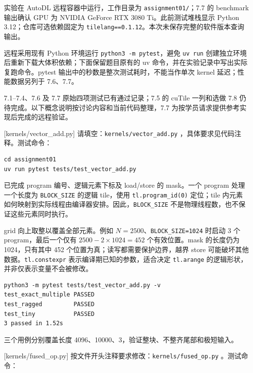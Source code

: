 \documentclass[11pt,a4paper,fontset=none]{ctexart}
\begin{document}
\begin{tcolorbox}[title={模块 7 实验环境与记录口径（2026-09-11）},breakable]
实验在 AutoDL 远程容器中运行，工作目录为 \texttt{assignment01/}；7.7 的 benchmark 输出确认 GPU 为 NVIDIA GeForce RTX 3080 Ti。此前测试堆栈显示 Python 3.12；仓库可选依赖固定为 \texttt{tilelang==0.1.12}。本次未保存完整的软件版本查询输出。

远程采用现有 Python 环境运行 \texttt{python3 -m pytest}，避免 \texttt{uv run} 创建独立环境后重新下载大体积依赖；下面保留题目原有的 uv 命令，并在实验记录中写出实际复跑命令。pytest 输出中的秒数是整次测试耗时，不能当作单次 kernel 延迟；性能数据另列于 7.6、7.7。

7.1--7.4、7.6 及 7.7 原始四项测试已有通过记录；7.5 的 cuTile 一列和选做 7.8 仍待完成。以下概念说明按讨论内容和当前代码整理，7.7 为按学员请求提供参考实现后完成的远程验证。
\end{tcolorbox}

[kernels/vector\_add.py]
请填空：\texttt{kernels/vector\_add.py} ，具体要求见代码注释。测试命令：

\begin{lstlisting}
cd assignment01
uv run pytest tests/test_vector_add.py
\end{lstlisting}

\begin{tcolorbox}[title={7.1 实现与实验记录},breakable]
已完成 program 编号、逻辑元素下标及 load/store 的 mask。一个 program 处理一个长度为 \texttt{BLOCK\_SIZE} 的逻辑 tile，使用 \texttt{tl.program\_id(0)} 定位；tile 内元素如何映射到实际线程由编译器安排。因此，\texttt{BLOCK\_SIZE} 不是物理线程数，也不保证这些元素同时执行。

grid 向上取整以覆盖全部元素。例如 $N=2500$、\texttt{BLOCK\_SIZE=1024} 时启动 3 个 program，最后一个仅有 $2500-2\times1024=452$ 个有效位置。mask 的长度仍为 1024，只有其中 452 个位置为真；读写都需要保护边界，越界 store 可能破坏其他数据。\texttt{tl.constexpr} 表示编译期已知的参数，适合决定 \texttt{tl.arange} 的逻辑形状，并非仅表示变量不会被修改。

\begin{lstlisting}
python3 -m pytest tests/test_vector_add.py -v
test_exact_multiple PASSED
test_ragged         PASSED
test_tiny           PASSED
3 passed in 1.52s
\end{lstlisting}
三个用例分别覆盖长度 4096、10000、3，验证整块、不整齐尾部和极短输入。
\end{tcolorbox}

[kernels/fused\_op.py]
按文件开头注释要求修改：\texttt{kernels/fused\_op.py} 。测试命令：
\end{document}
